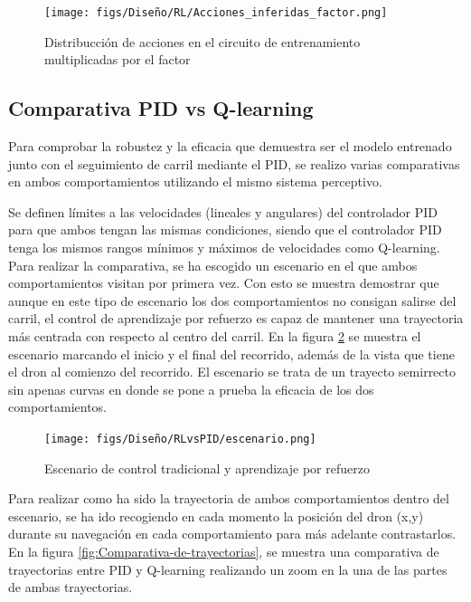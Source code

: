 \begin{figure} [H]
  \begin{center}
    \texttt{[image: figs/Diseño/RL/Acciones\_inferidas\_factor.png]}
  \end{center}
  \caption{Distribucción de acciones en el circuito de entrenamiento multiplicadas por el factor}
  \label{fig:inferencia_factor}
\end{figure}

\subsection{Comparativa PID vs Q-learning}
\label{sec:Análisis y comparativa entre el seguiento de carril clásico}
Para comprobar la robustez y la eficacia que demuestra ser el modelo entrenado junto con el seguimiento de carril mediante el PID, se realizo varias comparativas en ambos
comportamientos utilizando el mismo sistema perceptivo. 

Se definen límites a las velocidades (lineales y angulares) del controlador PID para que ambos tengan las mismas condiciones, siendo que el controlador PID tenga los mismos 
rangos mínimos y máximos de velocidades como Q-learning. Para realizar la comparativa, se ha escogido un escenario en el que ambos comportamientos visitan por primera vez. 
Con esto se muestra demostrar que aunque en este tipo de escenario los dos comportamientos no consigan salirse del carril, el control de aprendizaje por refuerzo 
es capaz de mantener una trayectoria más centrada con respecto al centro del carril. En la figura \ref{fig:escenario-comparativa} se muestra el escenario marcando el inicio 
y el final del recorrido, además de la vista que tiene el dron al comienzo del recorrido. El escenario se trata de un trayecto semirrecto sin apenas curvas en donde se pone a prueba
la eficacia de los dos comportamientos. 


\begin{figure} [H]
  \begin{center}
    \texttt{[image: figs/Diseño/RLvsPID/escenario.png]}
  \end{center}
  \caption{Escenario de control tradicional y aprendizaje por refuerzo}
  \label{fig:escenario-comparativa}
\end{figure}

Para realizar como ha sido la trayectoria de ambos comportamientos dentro del escenario, se ha ido recogiendo en cada momento la posición del dron (x,y) durante su navegación en cada
comportamiento para más adelante contrastarlos. En la figura \ref{fig:Comparativa-de-trayectorias}, se muestra una comparativa de trayectorias entre PID y Q-learning 
realizando un zoom en la una de las partes de ambas 
trayectorias.

